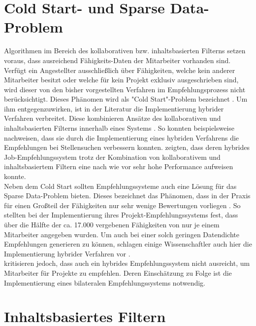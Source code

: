 \section{Cold Start- und Sparse Data-Problem}
\label{ch:empfehlungssysteme:coldStartUndSparseData}
Algorithmen im Bereich des kollaborativen bzw. inhaltsbasierten Filterns setzen voraus, dass ausreichend Fähigkeits-Daten der Mitarbeiter vorhanden sind. Verfügt ein Angestellter ausschließlich über Fähigkeiten, welche kein anderer Mitarbeiter besitzt oder welche für kein Projekt exklusiv ausgeschrieben sind, wird dieser von den bisher vorgestellten Verfahren im Empfehlungsprozess nicht berücksichtigt. Dieses Phänomen wird als "Cold Start"-Problem bezeichnet \cite[S. 1]{coldStart:2002}. Um ihm entgegenzuwirken, ist in der Literatur die Implementierung hybrider Verfahren verbreitet. Diese kombinieren Ansätze des kollaborativen und inhaltsbasierten Filterns innerhalb eines Systems \cite[S. 8]{malinowski:2008}. So konnten beispielsweise \textcite[S. 8]{combiningCbAndCFCostSensitiveApproach:2017} nachweisen, dass sie durch die Implementierung eines hybriden Verfahrens die Empfehlungen bei Stellensuchen verbessern konnten. \textcite[S. 16]{hybridImmunizing:2017} zeigten, dass deren hybrides Job-Empfehlungssystem trotz der Kombination von kollaborativem und inhaltsbasiertem Filtern eine nach wie vor sehr hohe Performance aufweisen konnte.\\
Neben dem Cold Start sollten Empfehlungssysteme auch eine Lösung für das Sparse Data-Problem bieten. Dieses bezeichnet das Phänomen, dass in der Praxis für einen Großteil der Fähigkeiten nur sehr wenige Bewertungen vorliegen \cite[S. 8]{recommenderSystems:2016}. So stellten \textcite[S. 3]{mitre:2014} bei der Implementierung ihres Projekt-Empfehlungssystems fest, dass über die Hälfte der ca. 17.000 vergebenen Fähigkeiten von nur je einem Mitarbeiter angegeben wurden. Um auch bei einer solch geringen Datendichte Empfehlungen generieren zu können, schlagen einige Wissenschaftler auch hier die Implementierung hybrider Verfahren vor \cite[S. 3]{weightedSimilarity:2015}.\\
\textcite[S. 1]{malinowski:2008} kritisieren jedoch, dass auch ein hybrides Empfehlungssystem nicht ausreicht, um Mitarbeiter für Projekte zu empfehlen. Deren Einschätzung zu Folge ist die Implementierung eines bilateralen Empfehlungssystems notwendig.

\section{Inhaltsbasiertes Filtern}
\label{ch:empfehlungssysteme:cfundcb}


